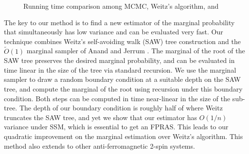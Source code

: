\documentclass[11pt]{amsart}
\theoremstyle{definition}
\theoremstyle{remark}
\begin{document}
\begin{figure}[!htbp]
  \centering
  \caption{Running time comparison among MCMC, Weitz's algorithm, and }
  \label{fig:run-time}
\end{figure}

The key to our method is to find a new estimator of the marginal probability that simultaneously has low variance and can be evaluated very fast.
Our technique combines Weitz's self-avoiding walk (SAW) tree construction and the $\widetilde{O}(1)$ marginal sampler of Anand and Jerrum \cite{AJ22}.
The marginal of the root of the SAW tree preserves the desired marginal probability,
and can be evaluated in time linear in the size of the tree via standard recursion.
We use the marginal sampler to draw a random boundary condition at a suitable depth on the SAW tree, and compute the marginal of the root using recursion under this boundary condition.
Both steps can be computed in time near-linear in the size of the sub-tree.
The depth of our boundary condition is roughly half of where Weitz truncates the SAW tree,
and yet we show that our estimator has $O(1/n)$ variance under SSM, which is essential to get an FPRAS.
This leads to our quadratic improvement on the marginal estimation over Weitz's algorithm.
This method also extends to other anti-ferromagnetic 2-spin systems.
\end{document}
